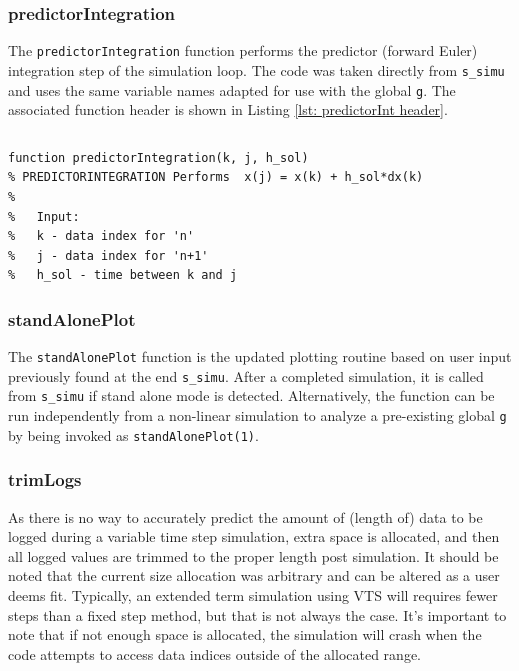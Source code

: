 \subsubsection{predictorIntegration}  
The \verb|predictorIntegration| function performs the predictor (forward Euler) integration step of the simulation loop.
The code was taken directly from \verb|s_simu| and uses the same variable names adapted for use with the global \verb|g|.
The associated function header is shown in Listing \ref{lst: predictorInt header}.

\begin{lstlisting}[caption={Function Header for predictorIntegration},label={lst: predictorInt header}]
\end{lstlisting}\vspace{-2 em}
\begin{verbatim}
function predictorIntegration(k, j, h_sol)
% PREDICTORINTEGRATION Performs  x(j) = x(k) + h_sol*dx(k)
%
%   Input:
%   k - data index for 'n'
%   j - data index for 'n+1'
%   h_sol - time between k and j
\end{verbatim}

\subsubsection{standAlonePlot}  
The \verb|standAlonePlot| function is the updated plotting routine based on user input previously found at the end \verb|s_simu|.
After a completed simulation, it is called from \verb|s_simu| if stand alone mode is detected.
Alternatively, the function can be run independently from a non-linear simulation to analyze a pre-existing global \verb|g| by being invoked as \verb|standAlonePlot(1)|.

\subsubsection{trimLogs}  
As there is no way to accurately predict the amount of (length of) data to be logged during a variable time step simulation, extra space is allocated, and then all logged values are trimmed to the proper length post simulation.
It should be noted that the current size allocation was arbitrary and can be altered as a user deems fit.
Typically, an extended term simulation using VTS will requires fewer steps than a fixed step method, but that is not always the case.
It's important to note that if not enough space is allocated, the simulation will crash when the code attempts to access data indices outside of the allocated range.

